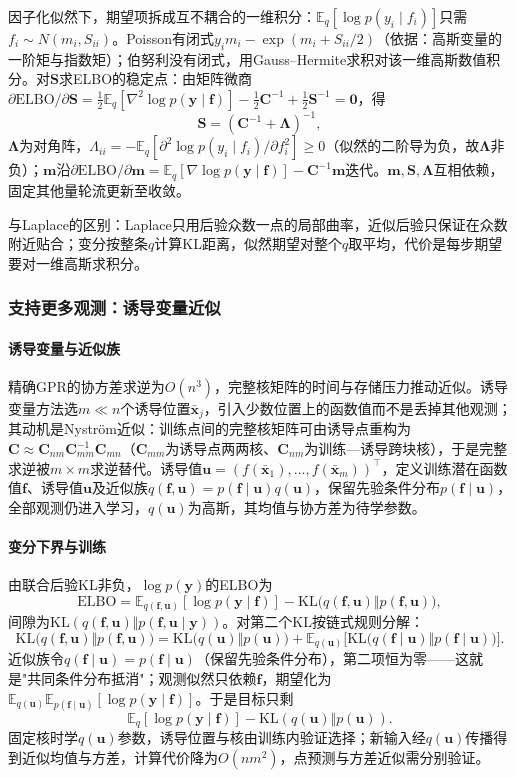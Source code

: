 因子化似然下，期望项拆成互不耦合的一维积分：$\mathbb E_q[\log p(y_i\mid f_i)]$只需$f_i\sim N(m_i,S_{ii})$。Poisson有闭式$y_i m_i-\exp(m_i+S_{ii}/2)$（依据：高斯变量的一阶矩与指数矩）；伯努利没有闭式，用Gauss--Hermite求积对该一维高斯数值积分。对$\bm S$求ELBO的稳定点：由矩阵微商$\partial\mathrm{ELBO}/\partial\bm S=\tfrac12\mathbb E_q[\nabla^2\log p(\bm y\mid\bm f)]-\tfrac12\bm C^{-1}+\tfrac12\bm S^{-1}=\bm 0$，得
\[
  \bm S=(\bm C^{-1}+\bm\Lambda)^{-1},
\]
$\bm\Lambda$为对角阵，$\Lambda_{ii}=-\mathbb E_q[\partial^2\log p(y_i\mid f_i)/\partial f_i^2]\ge0$（似然的二阶导为负，故$\bm\Lambda$非负）；$\bm m$沿$\partial\mathrm{ELBO}/\partial\bm m=\mathbb E_q[\nabla\log p(\bm y\mid\bm f)]-\bm C^{-1}\bm m$迭代。$\bm m,\bm S,\bm\Lambda$互相依赖，固定其他量轮流更新至收敛。

与Laplace的区别：Laplace只用后验众数一点的局部曲率，近似后验只保证在众数附近贴合；变分按整条$q$计算KL距离，似然期望对整个$q$取平均，代价是每步期望要对一维高斯求积分。


\subsubsection{支持更多观测：诱导变量近似}
\label{sec:regression-gp-computation}

\paragraph{诱导变量与近似族}

精确GPR的协方差求逆为$O(n^3)$，完整核矩阵的时间与存储压力推动近似。诱导变量方法选$m\ll n$个诱导位置$\bar{\bm{x}}_j$，引入少数位置上的函数值而不是丢掉其他观测；其动机是Nyström近似：训练点间的完整核矩阵可由诱导点重构为$\bm C\approx\bm C_{nm}\bm C_{mm}^{-1}\bm C_{mn}$（$\bm C_{mm}$为诱导点两两核、$\bm C_{nm}$为训练—诱导跨块核），于是完整求逆被$m\times m$求逆替代。诱导值$\bm{u}=(f(\bar{\bm{x}}_1),\ldots,f(\bar{\bm{x}}_m))^{\top}$，定义训练潜在函数值$\bm{f}$、诱导值$\bm{u}$及近似族$q(\bm{f},\bm{u})=p(\bm{f}\mid\bm{u})q(\bm{u})$，保留先验条件分布$p(\bm{f}\mid\bm{u})$，全部观测仍进入学习，$q(\bm{u})$为高斯，其均值与协方差为待学参数。

\paragraph{变分下界与训练}

由联合后验KL非负，$\log p(\bm{y})$的ELBO为
\[
  \mathrm{ELBO}=\mathbb E_{q(\bm f,\bm u)}[\log p(\bm y\mid\bm f)]
  -\mathrm{KL}\big(q(\bm f,\bm u)\Vert p(\bm f,\bm u)\big),
\]
间隙为$\mathrm{KL}(q(\bm f,\bm u)\Vert p(\bm f,\bm u\mid\bm y))$。对第二个KL按链式规则分解：
\[
  \mathrm{KL}\big(q(\bm f,\bm u)\Vert p(\bm f,\bm u)\big)
  =\mathrm{KL}\big(q(\bm u)\Vert p(\bm u)\big)
  +\mathbb E_{q(\bm u)}\big[\mathrm{KL}\big(q(\bm f\mid\bm u)\Vert p(\bm f\mid\bm u)\big)\big].
\]
近似族令$q(\bm f\mid\bm u)=p(\bm f\mid\bm u)$（保留先验条件分布），第二项恒为零——这就是"共同条件分布抵消"；观测似然只依赖$\bm f$，期望化为$\mathbb E_{q(\bm u)}\mathbb E_{p(\bm f\mid\bm u)}[\log p(\bm y\mid\bm f)]$。于是目标只剩
\[
  \mathbb E_q[\log p(\bm y\mid\bm f)]-\mathrm{KL}(q(\bm u)\Vert p(\bm u)).
\]
固定核时学$q(\bm u)$参数，诱导位置与核由训练内验证选择；新输入经$q(\bm u)$传播得到近似均值与方差，计算代价降为$O(nm^2)$，点预测与方差近似需分别验证。
